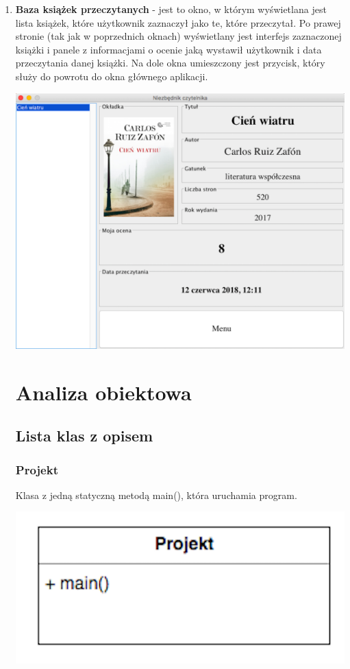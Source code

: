 \documentclass[a4paper,10pt]{article}
\begin{document}
\begin{enumerate}
\item \textbf{Baza książek przeczytanych } - jest to okno, w którym wyświetlana jest lista książek, które użytkownik zaznaczył jako te, które przeczytał. Po prawej stronie (tak jak w poprzednich oknach)
wyświetlany jest interfejs zaznaczonej książki i panele z informacjami o ocenie jaką wystawił użytkownik i data przeczytania danej książki. Na dole okna umieszczony jest przycisk, który służy do powrotu do okna głównego aplikacji.
\begin{center}
\includegraphics[scale=0.18]{BazaPrzeczytane.png}
\end{center}
\section{Analiza obiektowa}
\subsection{Lista klas z opisem}
\subsubsection{Projekt}
Klasa z jedną statyczną metodą main(), która uruchamia program.
\begin{center}
\includegraphics[scale=0.18]{UML8.png}
\end{center}


\end{enumerate}
\end{document}
